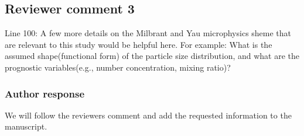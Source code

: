 \documentclass[11pt]{scrartcl}
\providecommand{\DIFadd}[1]{{\protect\textcolor{blue}{\uwave{#1}}}} %
\providecommand{\DIFdel}[1]{{\protect\textcolor{red}{\sout{#1}}}}                      %
\providecommand{\DIFaddbegin}{} %
\providecommand{\DIFaddend}{} %
\providecommand{\DIFdelbegin}{} %
\providecommand{\DIFdelend}{} %
\newenvironment{change}[1][]{%
  \begin{mdframed}[frametitle={Line #1:}]%
}{%
  \end{mdframed}%
}
\begin{document}
%


\subsection*{Reviewer comment 3}

Line 100: A few more details on the Milbrant and Yau microphysics sheme that are
relevant to this study would be helpful here. For example: What is the assumed
shape(functional form) of the particle size distribution, and what are the
prognostic variables(e.g., number concentration, mixing ratio)?

\subsubsection*{Author response}

We will follow the reviewers comment and add the requested information
to the manuscript.
\end{document}
